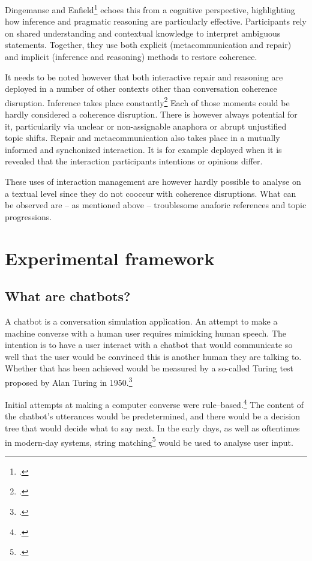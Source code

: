 \documentclass[12pt]{report}
\begin{document}
{\par
Dingemanse and Enfield\footcite{DINGEMANSE202430} echoes this from a cognitive perspective,
highlighting how inference and pragmatic reasoning are particularly effective.
Participants rely on shared understanding and contextual knowledge to interpret ambiguous statements.
Together, they use both
explicit (metacommunication and repair) and
implicit (inference and reasoning)
methods to restore coherence.

\par
It needs to be noted however that both interactive repair and reasoning are
deployed in a number of other contexts
other than conversation coherence disruption.
Inference takes place constantly\footcite{garfinkelstudies}
Each of those moments could be hardly considered a coherence disruption.
There is however always potential for it,
particularily via unclear or non-assignable anaphora or abrupt unjustified topic shifts.
Repair and metacommunication also takes place in a mutually informed and synchonized interaction.
It is for example deployed when it is revealed
that the interaction participants intentions or opinions differ.

\par
These uses of interaction management are however
hardly possible to analyse on a textual level
since they do not cooccur with coherence disruptions.
What can be observed are – as mentioned above –
troublesome anaforic references and topic progressions.


%

\chapter{Experimental framework}

\section{What are chatbots?}
\par
A chatbot is a conversation simulation application.
An attempt to make a machine converse with a human user requires mimicking human speech.
The intention is to have a user interact with a chatbot
that would communicate so well that
the user would be convinced
this is another human they are talking to.
Whether that has been achieved would be measured by a so-called Turing test
proposed by Alan Turing in 1950.\footcite{turing1950computing}

\par
Initial attempts at making a computer converse were rule–based.\footcite[p.~43]{mctear2020conversational}
The content of the chatbot's utterances
would be predetermined, and there would be a decision tree that would decide what to say next.
In the early days, as well as oftentimes in modern-day systems,
string matching\footcite{stringmatching} would be used to analyse user input.

}
\end{document}
